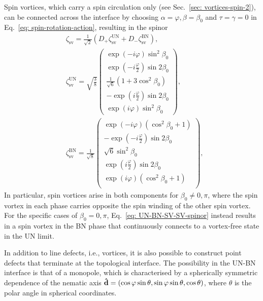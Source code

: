 Spin vortices, which carry a spin circulation only
(see Sec.~\ref{sec: vortices-spin-2}), can be connected across the interface by
choosing \(\alpha=\varphi, \beta=\beta_0 \) and \(\tau = \gamma = 0\) in
Eq.~\ref{eq: spin-rotation-action}, resulting in the spinor
\begin{align}\label{eq: UN-BN-SV-SV-spinor}
     & \zeta_\text{sv} =  \frac{1}{\sqrt{2}}\left( D_+\zeta^\text{UN}_\text{sv}
    + D_-\zeta^\text{BN}_\text{sv}\right),
    \\
     & \zeta^\text{UN}_\text{sv} =
    \sqrt{\frac38}
    \begin{pmatrix}
        \exp(-i\varphi)\sin^2\beta_0                    \\
        \exp(-i\frac{\varphi}{2})\sin 2 \beta _0        \\
        \frac{1}{\sqrt{6}}\left(1+3\cos^2\beta_0\right) \\
        -\exp(i\frac{\varphi}{2}) \sin 2 \beta _0       \\
        \exp(i\varphi)\sin^2\beta_0
    \end{pmatrix}, \label{eq: UN-SV-spinor}               \\
     & \zeta^\text{BN}_\text{sv} =
    \frac{1}{\sqrt{8}}
    \begin{pmatrix}
        \exp(-i\varphi)\left(\cos^2\beta_0 + 1\right)                        \\
        - \exp(-i\frac{\varphi}{2})\sin 2 \beta _0                           \\
        \sqrt{6}\sin^2\beta_0                                                \\
        \exp(i\frac{\varphi}{2})\sin 2 \beta _0                              \\
        \exp(i\varphi)\left(\cos^2\beta_0 + 1\right)\label{eq: BN-SV-spinor} \\
    \end{pmatrix},
\end{align}
In particular, spin vortices arise in both components for
\(\beta_0 \neq 0, \pi \), where the spin vortex in each phase carries opposite
the spin winding of the other spin vortex.
For the specific cases of \(\beta_0 = 0, \pi \),
Eq.~\eqref{eq: UN-BN-SV-SV-spinor} instead results in a spin vortex in the BN
phase that continuously connects to a vortex-free state in the UN limit.

In addition to line defects, i.e., vortices, it is also possible to construct
point defects that terminate at the topological interface.
The possibility in the UN-BN interface is that of a monopole, which is
characterised by a spherically symmetric dependence of the nematic axis
\(\vb{\hat{d}} = (\cos\varphi \sin\theta, \sin\varphi \sin\theta, \cos\theta)\),
where \(\theta \) is the polar angle in spherical coordinates.

